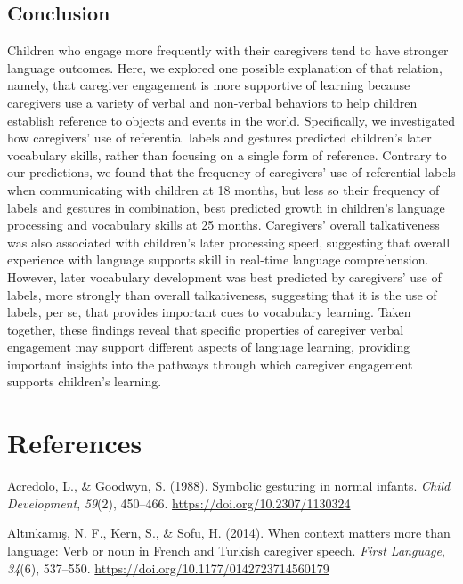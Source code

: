 \documentclass[
  english,
  man,mask]{apa6}
\begin{document}
\hypertarget{conclusion}{%
\subsection{Conclusion}\label{conclusion}}

Children who engage more frequently with their caregivers tend to have stronger language outcomes. Here, we explored one possible explanation of that relation, namely, that caregiver engagement is more supportive of learning because caregivers use a variety of verbal and non-verbal behaviors to help children establish reference to objects and events in the world. Specifically, we investigated how caregivers' use of referential labels and gestures predicted children's later vocabulary skills, rather than focusing on a single form of reference. Contrary to our predictions, we found that the frequency of caregivers' use of referential labels when communicating with children at 18 months, but less so their frequency of labels and gestures in combination, best predicted growth in children's language processing and vocabulary skills at 25 months. Caregivers' overall talkativeness was also associated with children's later processing speed, suggesting that overall experience with language supports skill in real-time language comprehension. However, later vocabulary development was best predicted by caregivers' use of labels, more strongly than overall talkativeness, suggesting that it is the use of labels, per se, that provides important cues to vocabulary learning. Taken together, these findings reveal that specific properties of caregiver verbal engagement may support different aspects of language learning, providing important insights into the pathways through which caregiver engagement supports children's learning.

\newpage

\hypertarget{references}{%
\section{References}\label{references}}

\hypertarget{refs}{}
\leavevmode\hypertarget{ref-acredolo_symbolic_1988}{}%
Acredolo, L., \& Goodwyn, S. (1988). Symbolic gesturing in normal infants. \emph{Child Development}, \emph{59}(2), 450--466. \url{https://doi.org/10.2307/1130324}

\leavevmode\hypertarget{ref-altinkamis_when_2014}{}%
Altınkamış, N. F., Kern, S., \& Sofu, H. (2014). When context matters more than language: Verb or noun in French and Turkish caregiver speech. \emph{First Language}, \emph{34}(6), 537--550. \url{https://doi.org/10.1177/0142723714560179}
\end{document}
